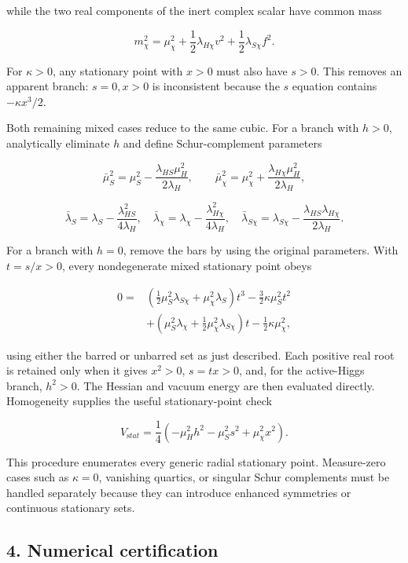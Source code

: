 \documentclass[
]{article}
\begin{document}
while the two real components of the inert complex scalar have common
mass

\[
m_\chi^2=\mu_\chi^2+\frac12\lambda_{H\chi}v^2
+\frac12\lambda_{S\chi}f^2.
\]

For \(\kappa>0\), any stationary point with \(x>0\) must also have
\(s>0\). This removes an apparent branch: \(s=0,x>0\) is inconsistent
because the \(s\) equation contains \(-\kappa x^3/2\).

Both remaining mixed cases reduce to the same cubic. For a branch with
\(h>0\), analytically eliminate \(h\) and define Schur-complement
parameters

\[
\bar\mu_S^2=\mu_S^2-\frac{\lambda_{HS}\mu_H^2}{2\lambda_H},
\qquad
\bar\mu_\chi^2=\mu_\chi^2+\frac{\lambda_{H\chi}\mu_H^2}{2\lambda_H},
\]

\[
\bar\lambda_S=\lambda_S-\frac{\lambda_{HS}^2}{4\lambda_H},
\quad
\bar\lambda_\chi=\lambda_\chi-\frac{\lambda_{H\chi}^2}{4\lambda_H},
\quad
\bar\lambda_{S\chi}=\lambda_{S\chi}
-\frac{\lambda_{HS}\lambda_{H\chi}}{2\lambda_H}.
\]

For a branch with \(h=0\), remove the bars by using the original
parameters. With \(t=s/x>0\), every nondegenerate mixed stationary point
obeys

\[
\begin{aligned}
0={}&\left(\frac12\mu_S^2\lambda_{S\chi}
+\mu_\chi^2\lambda_S\right)t^3
-\frac32\kappa\mu_S^2t^2\\
&+\left(\mu_S^2\lambda_\chi
+\frac12\mu_\chi^2\lambda_{S\chi}\right)t
-\frac12\kappa\mu_\chi^2,
\end{aligned}
\]

using either the barred or unbarred set as just described. Each positive
real root is retained only when it gives \(x^2>0\), \(s=tx>0\), and, for
the active-Higgs branch, \(h^2>0\). The Hessian and vacuum energy are
then evaluated directly. Homogeneity supplies the useful
stationary-point check

\[
V_{\mathrm stat}=\frac14\left(-\mu_H^2h^2-\mu_S^2s^2+\mu_\chi^2x^2\right).
\]

This procedure enumerates every generic radial stationary point.
Measure-zero cases such as \(\kappa=0\), vanishing quartics, or singular
Schur complements must be handled separately because they can introduce
enhanced symmetries or continuous stationary sets.

\hypertarget{numerical-certification}{%
\subsection{4. Numerical certification}\label{numerical-certification}}
\end{document}
